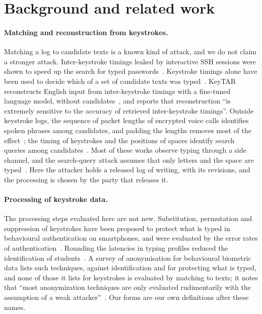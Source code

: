 \section{Background and related work}
\label{sec:related}


\paragraph{Matching and reconstruction from keystrokes.}
Matching a log to candidate texts is a known kind of attack, and we do not claim a stronger attack. Inter-keystroke
timings leaked by interactive SSH sessions were shown to speed up the search for typed passwords~\cite{song2001timing}.
Keystroke timings alone have been used to decide which of a set of candidate texts was typed~\cite{gonzalez2021reverse}. KeyTAR
reconstructs English input from inter-keystroke timings with a fine-tuned language model, without
candidates~\cite{qiu2026keytar}, and reports that reconstruction ``is extremely sensitive to the accuracy of retrieved
inter-keystroke timings''. Outside keystroke logs, the sequence of packet lengths of encrypted voice calls identifies
spoken phrases among candidates, and padding the lengths removes most of the effect~\cite{wright2008spotme}; the
timing of keystrokes and the positions of spaces identify search queries among candidates~\cite{monaco2019searching}.
Most of these works observe typing through a side channel, and the search-query attack assumes that only letters and
the space are typed~\cite{monaco2019searching}. Here the attacker holds a released log of writing, with its revisions,
and the processing is chosen by the party that releases it.

\paragraph{Processing of keystroke data.}
The processing steps evaluated here are not new. Substitution, permutation and suppression of keystrokes have been
proposed to protect what is typed in behavioural authentication on smartphones, and were evaluated by the error rates
of authentication~\cite{vassallo2017privacy}. Rounding the latencies in typing profiles reduced the identification of
students~\cite{leinonen2017preventing}. A survey of anonymisation for behavioural biometric data lists such
techniques, against identification and for protecting what is typed, and none of those it lists for keystrokes is
evaluated by matching to texts; it notes that ``most anonymization techniques are only evaluated rudimentarily with
the assumption of a weak attacker''~\cite{hanisch2021survey}. Our forms are our own definitions after these names.

